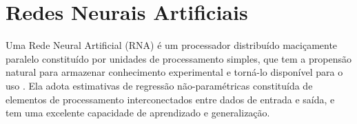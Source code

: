 
\section{Redes Neurais Artificiais}

Uma Rede Neural Artificial (RNA) é um processador distribuído maciçamente paralelo constituído por unidades de processamento simples, que tem a propensão natural para armazenar conhecimento experimental e torná-lo disponível para o uso \cite{linlee1996neuralfuzzy}. Ela adota estimativas de regressão não-paramétricas constituída de elementos de processamento interconectados entre dados de entrada e saída, e tem uma excelente capacidade de aprendizado e generalização.

